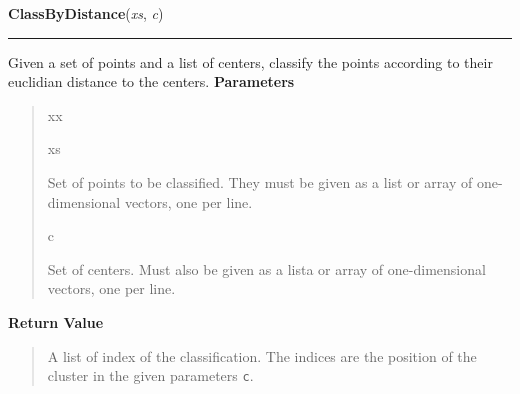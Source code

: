 \hspace{.8\funcindent}\begin{boxedminipage}{\funcwidth}

    \raggedright \textbf{ClassByDistance}(\textit{xs}, \textit{c})

    \vspace{-1.5ex}

    \rule{\textwidth}{0.5\fboxrule}
\setlength{\parskip}{2ex}

Given a set of points and a list of centers, classify the points according
to their euclidian distance to the centers.
\setlength{\parskip}{1ex}
      \textbf{Parameters}
      \vspace{-1ex}

      \begin{quote}
        \begin{Ventry}{xx}

          \item[xs]


Set of points to be classified. They must be given as a list or array of
one-dimensional vectors, one per line.
          \item[c]


Set of centers. Must also be given as a lista or array of
one-dimensional vectors, one per line.
        \end{Ventry}

      \end{quote}

      \textbf{Return Value}
    \vspace{-1ex}

      \begin{quote}

A list of index of the classification. The indices are the position of the
cluster in the given parameters \texttt{c}.
      \end{quote}

    \end{boxedminipage}

    \label{peach:nn:kmeans:ClusterByMean}

    \vspace{0.5ex}

